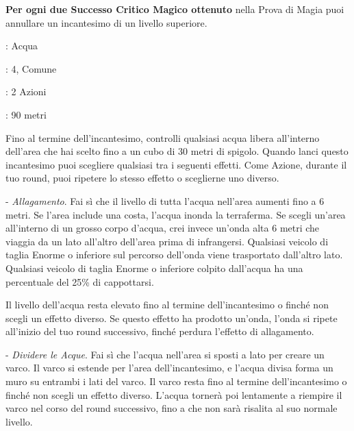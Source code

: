 \begin{multicols}{2}
\textbf{Per ogni due Successo Critico Magico ottenuto} nella Prova di Magia puoi annullare un incantesimo di un livello superiore.

\noindent\colorbox{OBSSgold!10}{
\begin{minipage}{0.95\linewidth}
\begin{description}[noitemsep, topsep=0pt, parsep=0pt, partopsep=0pt, leftmargin=0cm, labelwidth=1.3cm]
	\item[\textbf{Lista}]: Acqua
	\item[\textbf{Livello}]: 4, Comune
	\item[\textbf{Lancio}]: 2 Azioni
	\item[\textbf{Gittata}]: 90 metri
\end{description}
\end{minipage}}\smallskip

Fino al termine dell'incantesimo, controlli qualsiasi acqua libera all'interno dell'area che hai scelto fino a un cubo di 30 metri di spigolo. Quando lanci questo incantesimo puoi scegliere qualsiasi tra i seguenti effetti. Come Azione, durante il tuo round, puoi ripetere lo stesso effetto o sceglierne uno diverso.

\medskip

- \emph{Allagamento}. Fai sì che il livello di tutta l'acqua nell'area aumenti fino a 6 metri. Se l'area include una costa, l'acqua inonda la terraferma. Se scegli un'area all'interno di un grosso corpo d'acqua, crei invece un'onda alta 6 metri che viaggia da un lato all'altro dell'area prima di infrangersi. Qualsiasi veicolo di taglia Enorme o inferiore sul percorso dell'onda viene trasportato dall'altro lato. Qualsiasi veicolo di taglia Enorme o inferiore colpito dall'acqua ha una percentuale del 25\% di cappottarsi.

Il livello dell'acqua resta elevato fino al termine dell'incantesimo o finché non scegli un effetto diverso. Se questo effetto ha prodotto un'onda, l'onda si ripete all'inizio del tuo round successivo, finché perdura l'effetto di allagamento.

- \emph{Dividere le Acque}. Fai sì che l'acqua nell'area si sposti a lato per creare un varco. Il varco si estende per l'area dell'incantesimo, e l'acqua divisa forma un muro su entrambi i lati del varco. Il varco resta fino al termine dell'incantesimo o finché non scegli un effetto diverso. L'acqua tornerà poi lentamente a riempire il varco nel corso del round successivo, fino a che non sarà risalita al suo normale livello.


\end{multicols}
